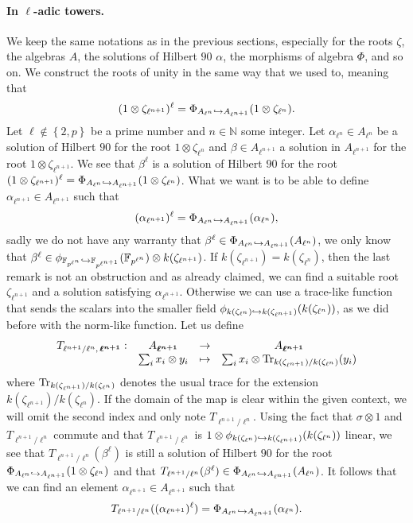 \documentclass[a4paper,11pt]{article}
\begin{document}
\paragraph{In $\ell$-adic towers.} We keep the same notations as in the previous
sections, especially for the roots $\zeta$, the algebras $A$, the solutions of
Hilbert $90$ $\alpha$, the morphisms of algebra $\Phi$, and so on. We construct the roots
of unity in the same way that we used to, meaning that 
\[
  (1\otimes\zeta_{\ell^{n+1}})^\ell = \Phi_{A_{\ell^n}\hookrightarrow
  A_{\ell^{n+1}}}(1\otimes\zeta_{\ell^n}).
\]
Let $\ell\notin \left\{ 2, p \right\}$ be a prime number and
$n\in\mathbb{N}$ some integer. Let $\alpha_{\ell^{n}}\in A_{\ell^{n}}$ be a
solution of Hilbert $90$ for the root $1\otimes\zeta_{\ell^{n}}$ and $\beta\in
A_{\ell^{n+1}}$ a solution in $A_{\ell^{n+1}}$ for the root
$1\otimes\zeta_{\ell^{n+1}}$. We see that
$\beta^\ell$ is a solution of Hilbert $90$ for the root
$(1\otimes\zeta_{\ell^{n+1}})^\ell=\Phi_{A_{\ell^n}\hookrightarrow
A_{\ell^{n+1}}}(1\otimes\zeta_{\ell^n})$. What we want is to be able to define
$\alpha_{\ell^{n+1}}\in A_{\ell^{n+1}}$ such that
\[
  (\alpha_{\ell^{n+1}})^\ell = \Phi_{A_{\ell^n}\hookrightarrow
  A_{\ell^{n+1}}}(\alpha_{\ell^n}),
\]
sadly we do not have any warranty that $\beta^{\ell}\in\Phi_{A_{\ell^n}\hookrightarrow
A_{\ell^{n+1}}}(A_{\ell^n})$, we only know that
$\beta^{\ell}\in\phi_{\mathbb{F}_{p^{\ell^n}}\hookrightarrow
\mathbb{F}_{p^{\ell^{n+1}}}}(\mathbb{F}_{p^{\ell^n}})\otimes
k(\zeta_{\ell^{n+1}})$. If $k(\zeta_{\ell^{n+1}})=k(\zeta_{\ell^n})$, then the
last remark is not an obstruction and as already claimed, we can find a suitable
root $\zeta_{\ell^{n+1}}$ and a solution satisfying $\alpha_{\ell^{n+1}}$.
Otherwise we can use a trace-like function that sends the scalars into the
smaller field $\phi_{k(\zeta_{\ell^{n}})\hookrightarrow
k(\zeta_{\ell^{n+1}})}(k(\zeta_{\ell^{n}}))$, as we did before with the
norm-like function. Let us define
\[
\begin{array}{cccc}
  T_{\ell^{n+1}/\ell^n,\, \bm{\ell^{n+1}}}: & A_{\bm{\ell^{n+1}}} & \to &
  A_{\bm{\ell^{n+1}}} \\
  & \sum_{i}x_i\otimes y_i & \mapsto & \sum_i
  x_i\otimes\operatorname{Tr}_{k(\zeta_{\ell^{n+1}})/k(\zeta_{\ell^{n}})}(y_i)
\end{array}
\]
where $\operatorname{Tr}_{k(\zeta_{\ell^{n+1}})/k(\zeta_{\ell^{n}})}$ denotes the usual trace
for the extension $k(\zeta_{\ell^{n+1}})/k(\zeta_{\ell^{n}})$. If the domain of the map is
clear within the given context, we will omit the second index and only note
$T_{\ell^{n+1}/\ell^n}$. Using the fact that $\sigma\otimes1$ and
$T_{\ell^{n+1}/\ell^{n}}$ commute and that $T_{\ell^{n+1}/\ell^n}$ is
$1\otimes\phi_{k(\zeta_{\ell^n})\hookrightarrow
k(\zeta_{\ell^{n+1}})}(k(\zeta_{\ell^{n}}))$ linear, we see that
$T_{\ell^{n+1}/\ell^n}(\beta^\ell)$ is still a solution of Hilbert $90$ for the
root $\Phi_{A_{\ell^n}\hookrightarrow A_{\ell^{n+1}}}(1\otimes\zeta_{\ell^n})$ and that
$T_{\ell^{n+1}/\ell^n}(\beta^\ell)\in\Phi_{A_{\ell^n}\hookrightarrow
A_{\ell^{n+1}}}(A_{\ell^n})$. It follows that we can find an element
$\alpha_{\ell^{n+1}}\in A_{\ell^{n+1}}$ such that
\[
  T_{\ell^{n+1}/\ell^n}((\alpha_{\ell^{n+1}})^\ell) = \Phi_{A_{\ell^{n}}\hookrightarrow
  A_{\ell^{n+1}}}(\alpha_{\ell^{n}}).
\]
\end{document}
